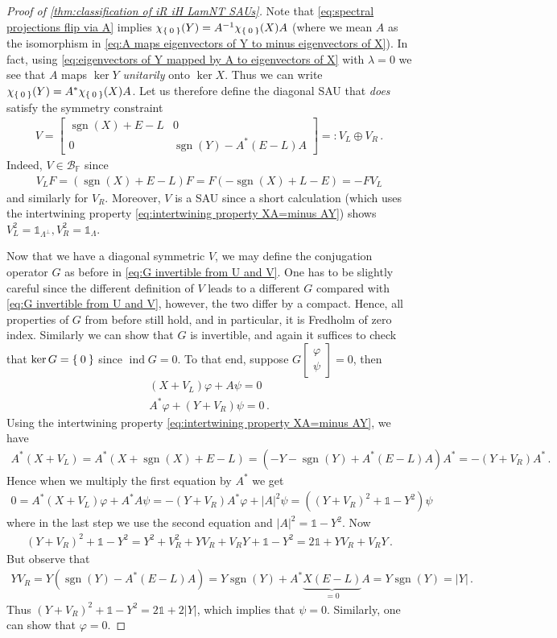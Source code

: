 \documentclass[a4paper,10pt]{article}
\numberwithin{equation}{section}
\theoremstyle{plain}
\theoremstyle{plain}
\theoremstyle{plain}
\theoremstyle{plain}
\theoremstyle{plain}
\theoremstyle{remark}
\theoremstyle{definition}
\theoremstyle{plain}
\newcommand{\FF}{\mathbb{F}}
\newcommand{\calB}{\mathcal{B}}
\newcommand{\vf}{\varphi}
\newcommand{\Id}{\mathds{1}}
\newcommand{\sgn}{\operatorname{sgn}}
\newcommand{\findex}{\operatorname{ind}}
\newcommand{\eq}[1]{\begin{align*}#1\end{align*}}
\begin{document}
\begin{proof}[Proof of \cref{thm:classification of iR iH LamNT SAUs}]
		Note that \cref{eq:spectral projections flip via A} implies $\chi_{\Set{0}}(Y)=A^{-1}\chi_{\Set{0}}(X)A$ (where we mean $A$ as the isomorphism in \cref{eq:A maps eigenvectors of Y to minus eigenvectors of X}). In fact, using \cref{eq:eigenvectors of Y mapped by A to eigenvectors of X} with $\lambda=0$ we see that $A$ maps $\ker Y$ \emph{unitarily} onto $\ker X$. Thus we can write $\chi_{\Set{0}}(Y)=A^*\chi_{\Set{0}}(X)A$. Let us therefore define the diagonal SAU that \emph{does} satisfy the symmetry constraint \eq{V=\begin{bmatrix}\sgn(X)+E-L & 0 \\ 0 & \sgn(Y)-A^*(E-L)A \end{bmatrix}=:V_L\oplus V_R\,.} 
		Indeed, $V\in\calB_\FF$ since \eq{V_LF=(\sgn(X)+E-L)F=F(-\sgn(X)+L-E)=-FV_L} and similarly for $V_R$. Moreover, $V$ is a SAU since a short calculation (which uses the intertwining property \cref{eq:intertwining property XA=minus AY}) shows $V_L^2=\Id_{\Lambda^\perp},V_R^2=\Id_\Lambda$.
		
		Now that we have a diagonal symmetric $V$, we may define the conjugation operator $G$ as before in \cref{eq:G invertible from U and V}. One has to be slightly careful since the different definition of $V$ leads to a different $G$ compared with \cref{eq:G invertible from U and V}, however, the two differ by a compact. Hence, all properties of $G$ from before still hold, and in particular, it is Fredholm of zero index. Similarly we can show that $G$ is invertible, and again it suffices to check that $\ker G=\Set{0}$ since $\findex G=0$. To that end, suppose $G\begin{bmatrix}\vf \\ \psi\end{bmatrix}=0$, then \eq{(X+V_L)\vf + A\psi = 0 \\ A^*\vf + (Y+V_R)\psi=0\,.} Using the intertwining property \cref{eq:intertwining property XA=minus AY}, we have \eq{A^*(X+V_L)=A^*(X+\sgn(X)+E-L)=(-Y-\sgn(Y)+A^*(E-L)A)A^*=-(Y+V_R)A^*\,.}
		Hence when we multiply the first equation by $A^*$ we get \eq{0=A^*(X+V_L)\vf+A^*A\psi=-(Y+V_R)A^*\vf + |A|^2\psi = ((Y+V_R)^2+\Id-Y^2)\psi} where in the last step we use the second equation and $|A|^2=\Id-Y^2.$ Now \eq{(Y+V_R)^2+\Id-Y^2=Y^2+V_R^2 + YV_R+V_RY + \Id-Y^2=2\Id + YV_R+V_RY\,.} 
		But observe that  \eq{YV_R=Y(\sgn(Y)-A^*(E-L)A)=Y\sgn(Y)+A^*\underbrace{X(E-L)}_{=0}A=Y\sgn(Y)=|Y|\,.} Thus $(Y+V_R)^2+\Id-Y^2=2\Id + 2|Y|$, which implies that $\psi=0$. Similarly, one can show that $\vf=0$.
		

\end{proof}
\end{document}
